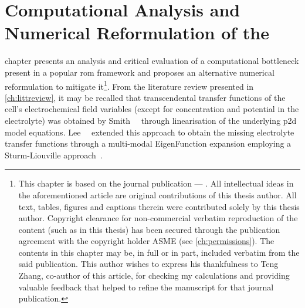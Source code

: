 
\graphicspath{{4/figures/}}

\chapter{Computational Analysis and Numerical Reformulation of the }\label{ch:improveddra}
\startcontents[chapters]

\bigskip

 chapter presents  an analysis and critical  evaluation of a
computational bottleneck present  in a popular \gls{rom}  framework and proposes
an  alternative numerical  reformulation  to  mitigate it\footnote{This  chapter
is  based  on the  journal  publication  --- .  All
intellectual ideas in  the aforementioned article are  original contributions of
this  thesis  author.  All  text,  tables, figures  and  captions  therein  were
contributed solely by this thesis author. Copyright clearance for non-commercial
verbatim  reproduction  of  the  content  (such as  in  this  thesis)  has  been
secured  through  the  publication  agreement with  the  copyright  holder  ASME
(see \cref{ch:permissions}). The contents in this chapter  may be, in full or in
part,  included  verbatim from  the  said  publication.  This author  wishes  to
express  his  thankfulness  to  Teng  Zhang,  co-author  of  this  article,  for
checking my calculations  and providing valuable feedback that  helped to refine
the  manuscript  for that  journal  publication.}.  From the  literature  review
presented  in \cref{ch:littreview},  it  may  be  recalled  that  transcendental
transfer  functions  of  the  cell's  electrochemical  field  variables  (except
for  concentration   and  potential   in  the   electrolyte)  was   obtained  by
Smith~\etal~\cite{Smith2007} through  linearisation of the  underlying \gls{p2d}
model  equations. Lee~\etal~\cite{Lee2012a,Lee2012}  extended  this approach  to
obtain  the  missing  electrolyte   transfer  functions  through  a  multi-modal
EigenFunction expansion employing a Sturm-Liouville approach~\cite{Pryce1993}.



